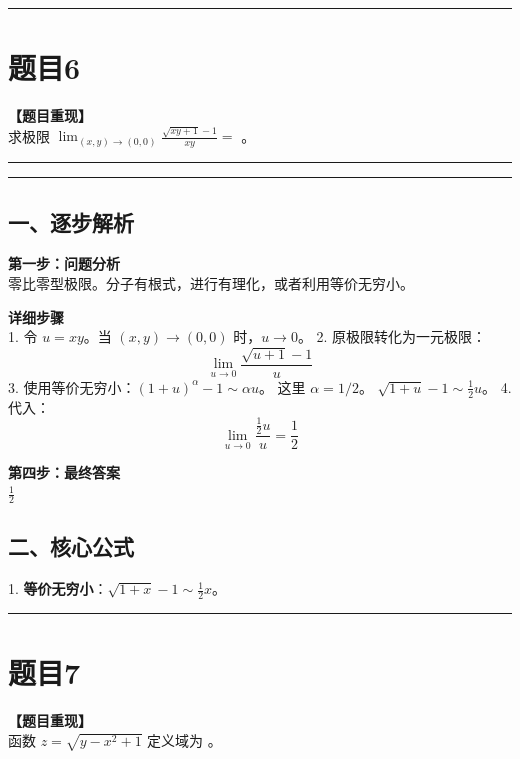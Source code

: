 \documentclass[12pt, a4paper]{ctexart}
\newcommand{\TopSeparator}{
    \par\noindent\rule{\textwidth}{1.5pt}\vspace{0.5em} %
}
\newcommand{\AnalysisSeparator}{
    \par\noindent\rule{\textwidth}{0.5pt}\vspace{0.2em}\hrule\vspace{0.5em} %
}
\newenvironment{RedAnalysis}{
    \par
    \color{red} %
}{
    \par
    \color{black} %
}
\begin{document}
\vspace{2em}

\TopSeparator
\section*{题目6}

\textbf{【题目重现】} \\
求极限 $ \lim_{(x,y)\to(0,0)}\frac{\sqrt{xy+1}-1}{xy}= $ \underline{\hspace{2cm}}。

\AnalysisSeparator

\begin{RedAnalysis}

\subsection*{一、逐步解析}

\textbf{第一步：问题分析} \\
零比零型极限。分子有根式，进行有理化，或者利用等价无穷小。

\textbf{详细步骤} \\
1. 令 $u = xy$。当 $(x,y) \to (0,0)$ 时，$u \to 0$。
2. 原极限转化为一元极限：
   \[ \lim_{u \to 0} \frac{\sqrt{u+1}-1}{u} \]
3. 使用等价无穷小：$(1+u)^\alpha - 1 \sim \alpha u$。
   这里 $\alpha = 1/2$。
   $\sqrt{1+u} - 1 \sim \frac{1}{2}u$。
4. 代入：
   \[ \lim_{u \to 0} \frac{\frac{1}{2}u}{u} = \frac{1}{2} \]

\textbf{第四步：最终答案} \\
$ \frac{1}{2} $

\subsection*{二、核心公式}
1. \textbf{等价无穷小}：$\sqrt{1+x}-1 \sim \frac{1}{2}x$。

\end{RedAnalysis}

\vspace{2em}

\TopSeparator
\section*{题目7}

\textbf{【题目重现】} \\
函数 $ z = \sqrt{y - x^{2} + 1} $ 定义域为 \underline{\hspace{2cm}}。
\end{document}
